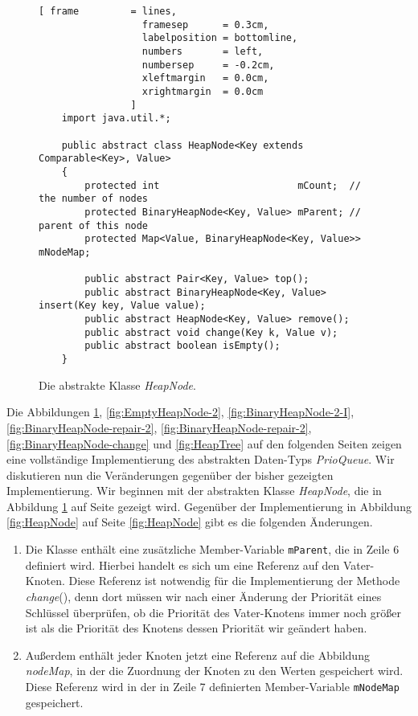 \begin{figure}[!h]
  \centering
\begin{Verbatim}[ frame         = lines, 
                  framesep      = 0.3cm, 
                  labelposition = bottomline,
                  numbers       = left,
                  numbersep     = -0.2cm,
                  xleftmargin   = 0.0cm,
                  xrightmargin  = 0.0cm
                ]
    import java.util.*;
    
    public abstract class HeapNode<Key extends Comparable<Key>, Value>
    {
        protected int                        mCount;  // the number of nodes
        protected BinaryHeapNode<Key, Value> mParent; // parent of this node
        protected Map<Value, BinaryHeapNode<Key, Value>> mNodeMap;
    
        public abstract Pair<Key, Value> top();    
        public abstract BinaryHeapNode<Key, Value> insert(Key key, Value value);
        public abstract HeapNode<Key, Value> remove();
        public abstract void change(Key k, Value v);
        public abstract boolean isEmpty();
    }
\end{Verbatim}
\vspace*{-0.3cm}
  \caption{Die abstrakte Klasse \textsl{HeapNode}.}
  \label{fig:HeapNode-2}
\end{figure}

Die Abbildungen \ref{fig:HeapNode-2},  \ref{fig:EmptyHeapNode-2},
\ref{fig:BinaryHeapNode-2-I},  \ref{fig:BinaryHeapNode-repair-2},
\ref{fig:BinaryHeapNode-repair-2}, \ref{fig:BinaryHeapNode-change} und \ref{fig:HeapTree} 
auf den folgenden Seiten zeigen eine vollst\"andige
Implementierung des abstrakten Daten-Typs \textsl{PrioQueue}.  Wir diskutieren nun die
Ver\"anderungen gegen\"uber der bisher gezeigten Implementierung.  
Wir beginnen mit der abstrakten Klasse \textsl{HeapNode}, die in Abbildung
\ref{fig:HeapNode-2} auf Seite \pageref{fig:HeapNode-2} gezeigt wird.
Gegen\"uber der Implementierung in Abbildung \ref{fig:HeapNode} auf Seite \ref{fig:HeapNode}
gibt es die folgenden Änderungen.
\begin{enumerate}
\item Die Klasse enth\"alt eine zus\"atzliche Member-Variable \texttt{mParent}, die in Zeile 6
      definiert wird.  Hierbei handelt es sich um eine Referenz auf den Vater-Knoten.
      Diese Referenz ist notwendig f\"ur die Implementierung der Methode \textsl{change}(),
      denn dort m\"ussen wir nach einer Änderung der Priorit\"at eines Schl\"ussel \"uberpr\"ufen, 
      ob die Priorit\"at des Vater-Knotens immer noch gr\"o{\ss}er ist als die Priorit\"at des Knotens dessen
      Priorit\"at wir ge\"andert haben.
\item Au{\ss}erdem enth\"alt jeder Knoten jetzt eine Referenz auf die Abbildung
      \textsl{nodeMap}, in der die Zuordnung der Knoten zu den Werten gespeichert wird.
      Diese Referenz wird in der in Zeile 7 definierten Member-Variable \texttt{mNodeMap}
      gespeichert.
\end{enumerate}

